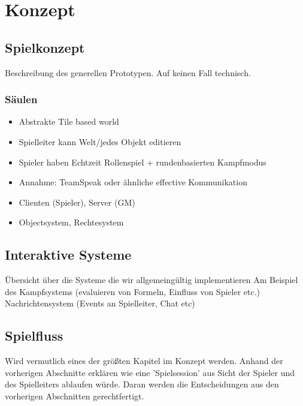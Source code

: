 \chapter{Konzept}
\label{concept}


\section{Spielkonzept}
\label{sec:Grobkonzept}
Beschreibung des generellen Prototypen. Auf keinen Fall technisch.

\subsection{Säulen}

\begin{itemize}
	\item Abstrakte Tile based world
	\item Spielleiter kann Welt/jedes Objekt editieren
	\item Spieler haben Echtzeit Rollenspiel + rundenbasierten Kampfmodus
	\item Annahme: TeamSpeak oder ähnliche effective Kommunikation
	\item Clienten (Spieler),  Server (GM)
	\item Objectsystem, Rechtesystem
\end{itemize}



\section{Interaktive Systeme}
\label{sec:InteraktiveSysteme}
Übersicht über die Systeme die wir allgemeingültig implementieren\newline
Am Beispiel des Kampfsystems (evaluieren von Formeln, Einfluss von Spieler etc.)\newline
Nachrichtensystem (Events an Spielleiter, Chat etc)\newline


\section{Spielfluss}
\label{sec:Spielfluss}
Wird vermutlich eines der größten Kapitel im Konzept werden. Anhand der vorherigen Abschnitte erklären wie eine 'Spielsession' aus Sicht der Spieler und des Spielleiters ablaufen würde. Daran werden die Entscheidungen aus den vorherigen Abschnitten gerechtfertigt.\newline
{}
